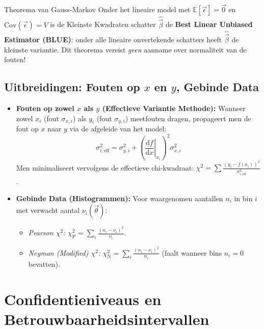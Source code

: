 \documentclass[11pt,a4paper]{article}
\newcommand{\E}{\mathbb{E}}
\newcommand{\Cov}{\text{Cov}}
\newcommand{\dd}{\mathrm{d}}
\begin{document}
\begin{theobox}{Theorema van Gauss-Markov}
Onder het lineaire model met $\E[\vec{\epsilon}] = \vec{0}$ en $\Cov(\vec{\epsilon}) = V$ is de Kleinste Kwadraten schatter $\hat{\vec{\beta}}$ de \textbf{Best Linear Unbiased Estimator (BLUE)}: onder alle lineaire onvertekende schatters heeft $\hat{\vec{\beta}}$ de kleinste variantie. Dit theorema vereist \emph{geen} aanname over normaliteit van de fouten!
\end{theobox}

\subsection{Uitbreidingen: Fouten op \texorpdfstring{$x$}{x} en \texorpdfstring{$y$}{y}, Gebinde Data}
\begin{itemize}[leftmargin=1.5em]
    \item \textbf{Fouten op zowel $x$ als $y$ (Effectieve Variantie Methode):}
    Wanneer zowel $x_i$ (fout $\sigma_{x,i}$) als $y_i$ (fout $\sigma_{y,i}$) meetfouten dragen, propageert men de fout op $x$ naar $y$ via de afgeleide van het model:
    \begin{equation}
        \sigma_{i,\text{eff}}^2 = \sigma_{y,i}^2 + \left( \left. \frac{\dd f}{\dd x} \right|_{x_i} \right)^2 \sigma_{x,i}^2
    \end{equation}
    Men minimaliseert vervolgens de effectieve chi-kwadraat: $\chi^2 = \sum \frac{(y_i - f(x_i))^2}{\sigma_{i,\text{eff}}^2}$.
    \item \textbf{Gebinde Data (Histogrammen):}
    Voor waargenomen aantallen $n_i$ in bin $i$ met verwacht aantal $\nu_i(\vec{\theta})$:
    \begin{itemize}
        \item \emph{Pearson $\chi^2$:} $\chi^2_{\text{P}} = \sum_i \frac{(n_i - \nu_i)^2}{\nu_i}$.
        \item \emph{Neyman (Modified) $\chi^2$:} $\chi^2_{\text{N}} = \sum_i \frac{(n_i - \nu_i)^2}{n_i}$ (faalt wanneer bins $n_i = 0$ bevatten).
    \end{itemize}
\end{itemize}


\section{Confidentieniveaus en Betrouwbaarheidsintervallen}
\end{document}

